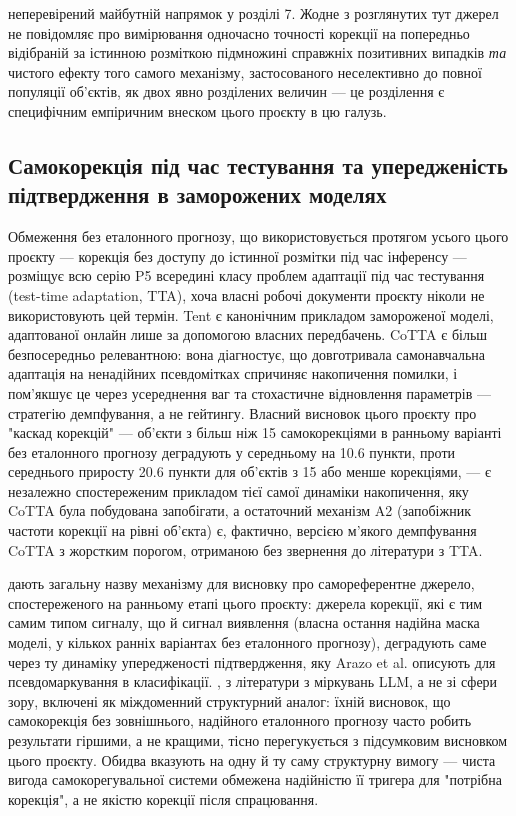 \documentclass[11pt]{article}
\begin{document}
неперевірений майбутній напрямок у розділі 7. Жодне з розглянутих тут джерел не повідомляє про вимірювання одночасно точності корекції на попередньо відібраній за істинною розміткою підмножині справжніх позитивних випадків \emph{та} чистого ефекту того самого механізму, застосованого неселективно до повної популяції об'єктів, як двох явно розділених величин --- це розділення є специфічним емпіричним внеском цього проєкту в цю галузь.

\subsection{Самокорекція під час тестування та упередженість підтвердження в заморожених моделях}

Обмеження без еталонного прогнозу, що використовується протягом усього цього проєкту --- корекція без доступу до істинної розмітки під час інференсу --- розміщує всю серію P5 всередині класу проблем адаптації під час тестування (test-time adaptation, TTA), хоча власні робочі документи проєкту ніколи не використовують цей термін. Tent \citep{wang2020tent} є канонічним прикладом замороженої моделі, адаптованої онлайн лише за допомогою власних передбачень. CoTTA \citep{wang2022cotta} є більш безпосередньо релевантною: вона діагностує, що довготривала самонавчальна адаптація на ненадійних псевдомітках спричиняє накопичення помилки, і пом'якшує це через усереднення ваг та стохастичне відновлення параметрів --- стратегію демпфування, а не гейтингу. Власний висновок цього проєкту про "каскад корекцій" --- об'єкти з більш ніж 15 самокорекціями в ранньому варіанті без еталонного прогнозу деградують у середньому на 10.6 пункти, проти середнього приросту 20.6 пункти для об'єктів з 15 або менше корекціями, --- є незалежно спостереженим прикладом тієї самої динаміки накопичення, яку CoTTA була побудована запобігати, а остаточний механізм A2 (запобіжник частоти корекції на рівні об'єкта) є, фактично, версією м'якого демпфування CoTTA з жорстким порогом, отриманою без звернення до літератури з TTA.

\citet{arazo2020} дають загальну назву механізму для висновку про самореферентне джерело, спостереженого на ранньому етапі цього проєкту: джерела корекції, які є тим самим типом сигналу, що й сигнал виявлення (власна остання надійна маска моделі, у кількох ранніх варіантах без еталонного прогнозу), деградують саме через ту динаміку упередженості підтвердження, яку Arazo et al. описують для псевдомаркування в класифікації. \citet{huang2023}, з літератури з міркувань LLM, а не зі сфери зору, включені як міждоменний структурний аналог: їхній висновок, що самокорекція без зовнішнього, надійного еталонного прогнозу часто робить результати гіршими, а не кращими, тісно перегукується з підсумковим висновком цього проєкту. Обидва вказують на одну й ту саму структурну вимогу --- чиста вигода самокорегувальної системи обмежена надійністю її тригера для "потрібна корекція", а не якістю корекції після спрацювання.
\end{document}
